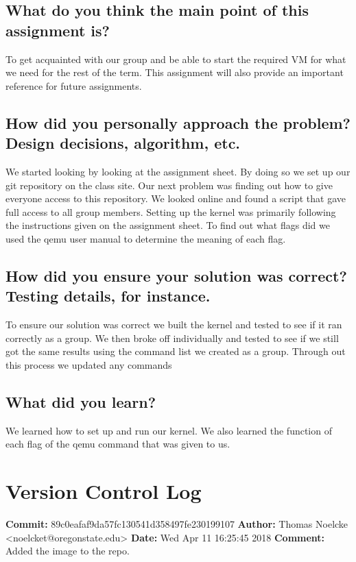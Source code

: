 \documentclass[draftclsnofoot, onecolumn, compsoc, 10pt]{IEEEtran}
\begin{document}
\subsection{What do you think the main point of this assignment is?}
To get acquainted with our group and be able to start the required VM for what we need for the rest of the term. This assignment will also provide an important reference for future assignments.\\
\subsection{How did you personally approach the problem? Design decisions, algorithm, etc.}
We started looking by looking at the assignment sheet. By doing so we set up our git repository on the class site. Our next problem was finding out how to give everyone access to this repository. We looked online and found a script that gave full access to all group members. Setting up the kernel was primarily following the instructions given on the assignment sheet. To find out what flags did we used the qemu user manual to determine the meaning of each flag.\\
\subsection{How did you ensure your solution was correct? Testing details, for instance.}
To ensure our solution was correct we built the kernel and tested to see if it ran correctly as a group. We then broke off individually and tested to see if we still got the same results using the command list we created as a group. Through out this process we updated any commands \\
\subsection{What did you learn?}
We learned how to set up and run our kernel. We also learned the function of each flag of the qemu command that was given to us.\\

\section{Version Control Log}
		\begin{center}
			\textbf{Commit:} 89c0eafaf9da57fc130541d358497fe230199107
			\textbf{Author:} Thomas Noelcke <noelcket@oregonstate.edu>
			\textbf{Date:} Wed Apr 11 16:25:45 2018 
			\textbf{Comment:} Added the image to the repo.
		\end{center}
\end{document}
